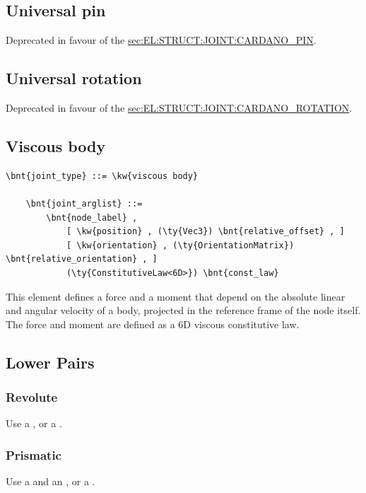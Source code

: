 \subsection{Universal pin}
\label{sec:EL:STRUCT:JOINT:UNIVERSAL_PIN}
Deprecated in favour of the
\hyperref{\kw{cardano pin}}{\kw{cardano pin} (see Section~}{)}{sec:EL:STRUCT:JOINT:CARDANO_PIN}.



\subsection{Universal rotation}
\label{sec:EL:STRUCT:JOINT:UNIVERSAL_ROTATION}
Deprecated in favour of the
\hyperref{\kw{cardano rotation}}{\kw{cardano rotation} (see Section~}{)}{sec:EL:STRUCT:JOINT:CARDANO_ROTATION}.

\subsection{Viscous body}
\label{sec:EL:STRUCT:JOINT:VISCOUS_BODY}
\begin{Verbatim}[commandchars=\\\{\}]
    \bnt{joint_type} ::= \kw{viscous body}

    \bnt{joint_arglist} ::=
        \bnt{node_label} ,
            [ \kw{position} , (\ty{Vec3}) \bnt{relative_offset} , ]
            [ \kw{orientation} , (\ty{OrientationMatrix}) \bnt{relative_orientation} , ]
            (\ty{ConstitutiveLaw<6D>}) \bnt{const_law}
\end{Verbatim}
This element defines a force and a moment that depend on the absolute 
linear and angular velocity of a body, projected in the reference frame
of the node itself.
The force and moment are defined as a 6D viscous constitutive law.


\subsection{Lower Pairs}

\subsubsection{Revolute}
Use a , or a .

\subsubsection{Prismatic}
Use a  and an , or a .

